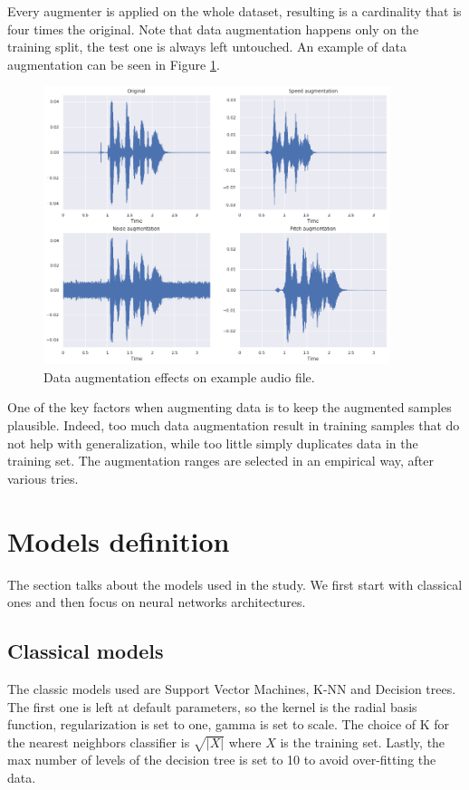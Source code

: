 \noindent Every augmenter is applied on the whole dataset, resulting 
is a cardinality that is four times the original.
Note that data augmentation happens only on the training split, the test one is 
always left untouched. 
An example of data augmentation can be seen in Figure \ref{fig:aug}. 

\begin{figure}[H]
  \begin{center}
    \includegraphics[width=0.9\textwidth]{images/aug.png}
    \caption{Data augmentation effects on example audio file.} \label{fig:aug}
  \end{center}
\end{figure}

\noindent One of the key factors when augmenting data is to keep the augmented samples plausible. 
Indeed, too much data augmentation result in training samples that do not help with generalization, 
while too little simply duplicates data in the training set.
The augmentation ranges are selected in an empirical way, after various tries. 

\section{Models definition}

The section talks about the models used in the study. 
We first start with classical ones and then focus on neural networks 
architectures.

\subsection{Classical models}
The classic models used are Support Vector Machines, K-NN and Decision trees.
The first one is left at default parameters, so the kernel is the radial basis function, 
regularization is set to one, gamma is set to scale. 
The choice of K for the nearest neighbors classifier is $\sqrt{|X|}$ where $X$ is the training set.
Lastly, the max number of levels of the decision tree is set to 10 to avoid 
over-fitting the data.

